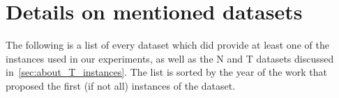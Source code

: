 \documentclass[ppgc,tese,english,formais,babel]{iiufrgs}
\begin{document}

%




\appendix

\chapter{Details on mentioned datasets}
\label{sec:datasets}

The following is a list of every dataset which did provide at least one of the instances used in our experiments, as well as the N and T datasets discussed in~\cref{sec:about_T_instances}.
The list is sorted by the year of the work that proposed the first (if not all) instances of the dataset.

\end{document}
